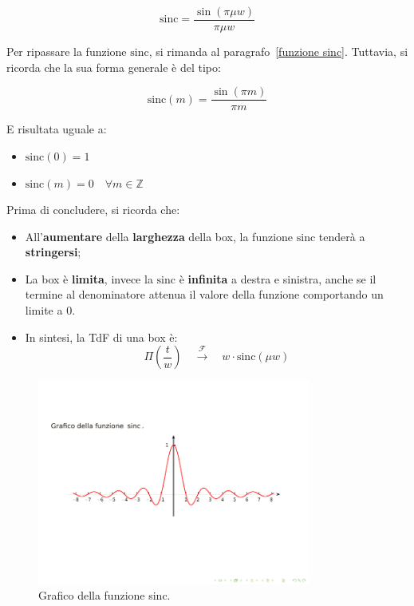 \documentclass[a4paper]{article}
\begin{document}
	\begin{equation*}
		\mathrm{sinc} = \dfrac{\sin\left(\pi \mu w\right)}{\pi \mu w}
	\end{equation*}

	\noindent
	Per ripassare la funzione $\mathrm{sinc}$, si rimanda al paragrafo~\ref{funzione sinc}. Tuttavia, si ricorda che la sua forma generale è del tipo:
	
	\begin{equation*}
		\mathrm{sinc} \left(m\right) = \dfrac{\sin \left(\pi m\right)}{\pi m}
	\end{equation*}

	\noindent
	E risultata uguale a:
	
	\begin{itemize}
		\item $\mathrm{sinc}\left(0\right) = 1$
		\item $\mathrm{sinc}\left(m\right) = 0 \hspace{1em} \forall m \in \mathbb{Z}$
	\end{itemize}

	\noindent
	Prima di concludere, si ricorda che:
	
	\begin{itemize}[label=]
		\item All'\textbf{aumentare} della \textbf{larghezza} della box, la funzione $\mathrm{sinc}$ tenderà a \textbf{stringersi};
		
		\item La box è \textbf{limita}, invece la $\mathrm{sinc}$ è \textbf{infinita} a destra e sinistra, anche se il termine al denominatore attenua il valore della funzione comportando un limite a $0$.
			
		\item In sintesi, la TdF di una box è:
			\begin{equation*}
				\Pi\left(\dfrac{t}{w}\right) \hspace{1em} \xrightarrow{\mathcal{F}} \hspace{1em} w \cdot \mathrm{sinc} \left(\mu w\right)
			\end{equation*}
	\end{itemize}

	\begin{figure}[!htp]
		\centering
		\includegraphics[width=0.8\textwidth]{img/sinc.pdf}
		\caption{Grafico della funzione sinc.}\label{grafico sinc}
	\end{figure}
\end{document}
